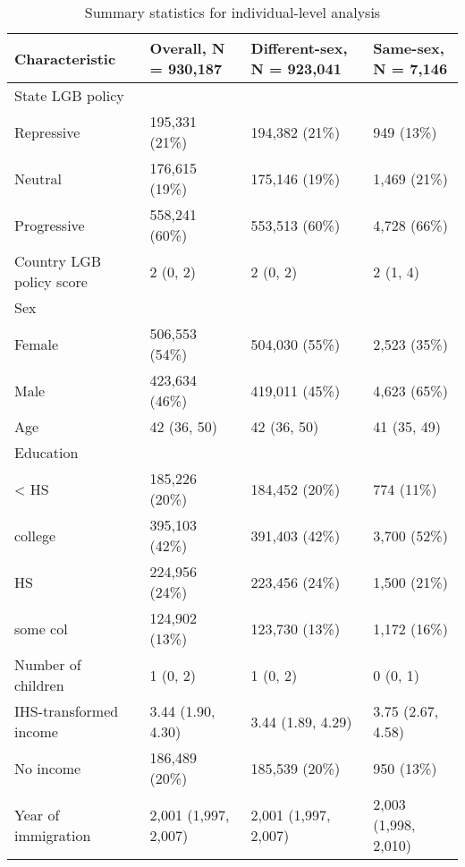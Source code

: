 \documentclass[
  11pt,
]{article}
\begin{document}
\begin{table}[!h]

\caption{\label{tab:desc-table-ind}Summary statistics for individual-level analysis}
\centering
\fontsize{8}{10}\selectfont
\begin{tabular}[t]{llll}
\toprule
Characteristic & Overall, N = 930,187 & Different-sex, N = 923,041 & Same-sex, N = 7,146\\
\midrule
State LGB policy &  &  & \\
\hspace{1em}Repressive & 195,331 (21\%) & 194,382 (21\%) & 949 (13\%)\\
\hspace{1em}Neutral & 176,615 (19\%) & 175,146 (19\%) & 1,469 (21\%)\\
\hspace{1em}Progressive & 558,241 (60\%) & 553,513 (60\%) & 4,728 (66\%)\\
Country LGB policy score & 2 (0, 2) & 2 (0, 2) & 2 (1, 4)\\
\addlinespace
Sex &  &  & \\
\hspace{1em}Female & 506,553 (54\%) & 504,030 (55\%) & 2,523 (35\%)\\
\hspace{1em}Male & 423,634 (46\%) & 419,011 (45\%) & 4,623 (65\%)\\
Age & 42 (36, 50) & 42 (36, 50) & 41 (35, 49)\\
Education &  &  & \\
\addlinespace
\hspace{1em}< HS & 185,226 (20\%) & 184,452 (20\%) & 774 (11\%)\\
\hspace{1em}college & 395,103 (42\%) & 391,403 (42\%) & 3,700 (52\%)\\
\hspace{1em}HS & 224,956 (24\%) & 223,456 (24\%) & 1,500 (21\%)\\
\hspace{1em}some col & 124,902 (13\%) & 123,730 (13\%) & 1,172 (16\%)\\
Number of children & 1 (0, 2) & 1 (0, 2) & 0 (0, 1)\\
\addlinespace
IHS-transformed income & 3.44 (1.90, 4.30) & 3.44 (1.89, 4.29) & 3.75 (2.67, 4.58)\\
No income & 186,489 (20\%) & 185,539 (20\%) & 950 (13\%)\\
Year of immigration & 2,001 (1,997, 2,007) & 2,001 (1,997, 2,007) & 2,003 (1,998, 2,010)\\

\end{tabular}
\end{table}
\end{document}
